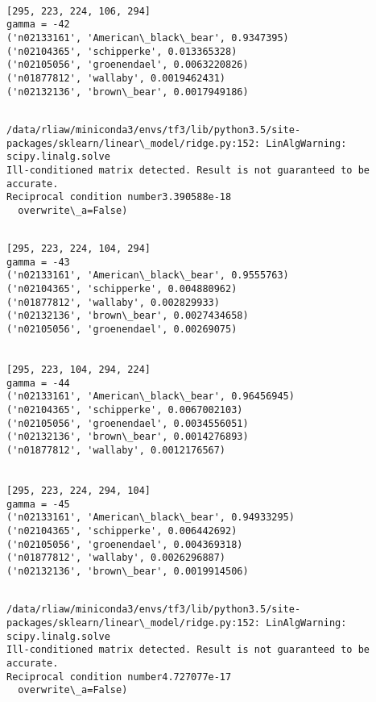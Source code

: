 \documentclass[11pt]{article}
\begin{document}
    \begin{Verbatim}[commandchars=\\\{\}]

[295, 223, 224, 106, 294]
gamma = -42
('n02133161', 'American\_black\_bear', 0.9347395)
('n02104365', 'schipperke', 0.013365328)
('n02105056', 'groenendael', 0.0063220826)
('n01877812', 'wallaby', 0.0019462431)
('n02132136', 'brown\_bear', 0.0017949186)


    \end{Verbatim}

    \begin{Verbatim}[commandchars=\\\{\}]
/data/rliaw/miniconda3/envs/tf3/lib/python3.5/site-packages/sklearn/linear\_model/ridge.py:152: LinAlgWarning: scipy.linalg.solve
Ill-conditioned matrix detected. Result is not guaranteed to be accurate.
Reciprocal condition number3.390588e-18
  overwrite\_a=False)

    \end{Verbatim}

    \begin{Verbatim}[commandchars=\\\{\}]

[295, 223, 224, 104, 294]
gamma = -43
('n02133161', 'American\_black\_bear', 0.9555763)
('n02104365', 'schipperke', 0.004880962)
('n01877812', 'wallaby', 0.002829933)
('n02132136', 'brown\_bear', 0.0027434658)
('n02105056', 'groenendael', 0.00269075)


[295, 223, 104, 294, 224]
gamma = -44
('n02133161', 'American\_black\_bear', 0.96456945)
('n02104365', 'schipperke', 0.0067002103)
('n02105056', 'groenendael', 0.0034556051)
('n02132136', 'brown\_bear', 0.0014276893)
('n01877812', 'wallaby', 0.0012176567)


[295, 223, 224, 294, 104]
gamma = -45
('n02133161', 'American\_black\_bear', 0.94933295)
('n02104365', 'schipperke', 0.006442692)
('n02105056', 'groenendael', 0.004369318)
('n01877812', 'wallaby', 0.0026296887)
('n02132136', 'brown\_bear', 0.0019914506)


    \end{Verbatim}

    \begin{Verbatim}[commandchars=\\\{\}]
/data/rliaw/miniconda3/envs/tf3/lib/python3.5/site-packages/sklearn/linear\_model/ridge.py:152: LinAlgWarning: scipy.linalg.solve
Ill-conditioned matrix detected. Result is not guaranteed to be accurate.
Reciprocal condition number4.727077e-17
  overwrite\_a=False)

    \end{Verbatim}
\end{document}
